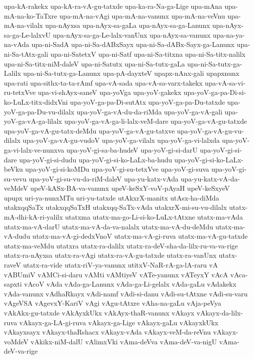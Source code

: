 {upa-kA-rakekx
upa-kA-ra-vA-gu-tatxde
upa-ka-ra-Na-ga-Lige
upa-mAna
upa-mA-na-ko-TaTxre
upa-mA-na-vAgi
upa-mA-na-vanunx
upa-mA-na-veVnu
upa-mA-na-vilalx
upa-nAyxsa
upa-nAyx-sa-gaLa
upa-nAyx-sa-ga-Lanunx
upa-nAyx-sa-ga-Le-lalxvU
upa-nAyx-sa-ga-Le-lalx-vanUnx
upa-nAyx-sa-vanunx
upa-na-ya-na-vAda
upa-ni-SadA
upa-ni-Sa-dABxSayx
upa-ni-Sa-dABx-Sayx-ga-Lanunx
upa-ni-Sa-tAtx-gali
upa-ni-SatetxV
upa-ni-Satf
upa-ni-Sa-titxna
upa-ni-Sa-titx-nalilx
upa-ni-Sa-titx-niM-daleV
upa-ni-Satutx
upa-ni-Sa-tutx-gaLa
upa-ni-Sa-tutx-ga-Lalilx
upa-ni-Sa-tutx-ga-Lanunx
upa-pA-dayxteV
upapx-nAnx-gali
upapxnunx
upa-rati
upa-sithx-ta-ta-rAmf
upa-vA-sada
upa-vA-sa-varx-takekx
upa-vA-sa-vi-ru-tetxVve
upa-vi-shAyx-saneV
upa-yoVga
upa-yoV-gakekx
upa-yoV-ga-pa-Di-si-ko-LuLx-titx-didxVni
upa-yoV-ga-pa-Di-sutAtx
upa-yoV-ga-pa-Du-tatxde
upa-yoV-ga-pa-Du-vu-dilalx
upa-yoV-ga-vA-du-da-riMda
upa-yoV-ga-vA-gali
upa-yoV-ga-vA-ga-lilalx
upa-yoV-ga-vA-ga-li-lalx-veM-dare
upa-yoV-ga-vA-gu-tatxde
upa-yoV-ga-vA-gu-tatx-deMdu
upa-yoV-ga-vA-gu-tatxve
upa-yoV-ga-vA-gu-vu-dilalx
upa-yoV-ga-vA-gu-vudoV
upa-yoV-ga-vilalx
upa-yoV-ga-vi-lalxda
upa-yoV-ga-vi-lalx-ve-nunxva
upa-yoV-gi-sa-ba-hudeV
upa-yoV-gi-si-darU
upa-yoV-gi-si-dare
upa-yoV-gi-si-dudu
upa-yoV-gi-si-ko-LaLx-ba-hudu
upa-yoV-gi-si-ko-LaLx-beVku
upa-yoV-gi-si-koMDu
upa-yoV-gi-su-tetxVve
upa-yoV-gi-suva
upa-yoV-gi-su-vevu
upa-yoV-gi-su-vu-da-riM-daleV
upa-yu-katx-vAda
upa-yu-katx-vA-da-veMdeV
upeV-kASx-BA-va-vanunx
upeV-keSxY-voV-pAyaH
upeV-keSxyeV
upupx
uri-ya-nunxMTu
uri-yu-tatxde
utAkxrX-manitx
utAsx-ha-diMda
utakxqqSaTx
utakxqqSaTxH
utakxqq-SaTx-vAda
utakxrX-mi-su-vu-dilalx
utatx-mA-dhi-kA-ri-yalilx
utatxma
utatx-ma-go-Li-si-ko-LuLx-tAtxne
utatx-ma-vAda
utatx-ma-vA-darU
utatx-ma-vA-da-va-nalalx
utatx-ma-vA-du-deMdu
utatx-ma-vA-dudu
utatx-ma-vA-gi-dedxVnoV
utatx-ma-vA-gi-ruva
utatx-ma-vA-gu-tatxde
utatx-ma-veMdu
utatxra
utatx-ra-dalilx
utatx-ra-deV-sha-da-lilx-ru-va-va-rige
utatx-ra-nAyxsa
utatx-ra-vAgi
utatx-ra-vA-gu-tatxde
utatx-ra-vanUnx
utatx-raveV
utatx-ra-vide
utatx-riV-ya-vanunx
utitxV-NaR-rA-ga-lA-raru
vA
vABUmiV
vAMCi-si-daru
vAMti
vAMtiyeV
vATe-yanunx
vATeyxY
vAcA
vAca-sapxti
vAcoV
vAda
vAda-ga-Lanunx
vAda-ga-Li-gelalx
vAda-gaLu
vAdakekx
vAda-vanunx
vAdhaRkayx
vAdi-namf
vAdi-si-danu
vAdi-su-tAtxne
vAdi-su-varu
vAgeVSA
vAgevxY-KariV
vAgi
vAgu-tAtxre
vAha-na-gaLu
vAja-peVya
vAkAkx-gu-tatxde
vAkAyxkUkx
vAkAyx-thaR-vanunx
vAkayx
vAkayx-da-lilx-ruva
vAkayx-ga-LA-gi-ruva
vAkayx-ga-Lige
vAkayx-gaLu
vAkayxkUkx
vAkayxsayx
vAkayx-thaRshacx
vAkayx-vAda
vAkayx-veM-da-reVnu
vAkayx-voMdeV
vAkikx-niM-dalU
vAlimxVki
vAma-deVva
vAma-deV-va-nigU
vAma-deV-va-rige
}
